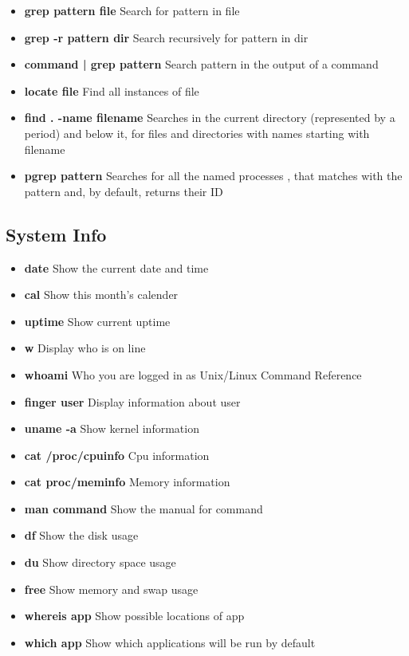 \begin{itemize}
	\item \textbf{grep pattern file} Search for pattern in file
	\item \textbf{grep -r pattern dir} Search recursively for pattern in dir
	\item \textbf{command | grep pattern} Search pattern in the output of a command
	\item \textbf{locate file} Find all instances of file
	\item \textbf{find . -name filename} Searches in the current directory (represented by a period) and below it, for files and directories with names starting with filename
	\item \textbf{pgrep pattern} Searches for all the named processes , that matches with the pattern and, by default, returns their ID
\end{itemize}

\subsection{System Info}

\begin{itemize}	
	\item \textbf{date} Show the current date and time
	\item \textbf{cal} Show this month's calender
	\item \textbf{uptime} Show current uptime
	\item \textbf{w} Display who is on line
	\item \textbf{whoami} Who you are logged in as Unix/Linux Command Reference 
	\item \textbf{finger user} Display information about user
	\item \textbf{uname -a} Show kernel information
	\item \textbf{cat /proc/cpuinfo} Cpu information
	\item \textbf{cat proc/meminfo} Memory information
	\item \textbf{man command} Show the manual for command
	\item \textbf{df} Show the disk usage
	\item \textbf{du} Show directory space usage
	\item \textbf{free} Show memory and swap usage
	\item \textbf{whereis app} Show possible locations of app
	\item \textbf{which app} Show which applications will be run by default
\end{itemize}

